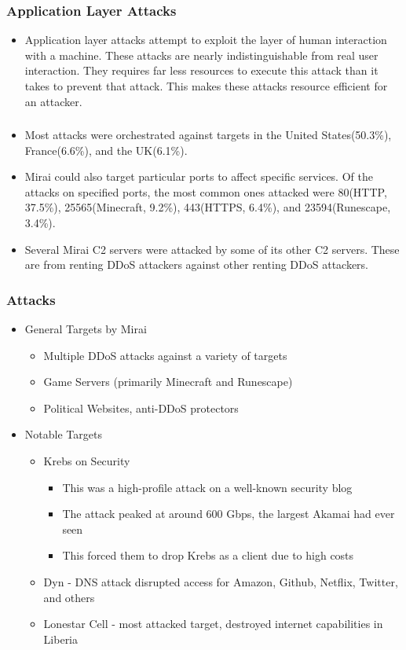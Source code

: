 \documentclass{beamer}
\begin{document}
\begin{frame}
    \frametitle{Application Layer Attacks}
        \begin{itemize}
            \item Application layer attacks attempt to exploit the layer of human interaction with a machine. These attacks are nearly indistinguishable from real user interaction. They requires far less resources to execute this attack than it takes to prevent that attack. This makes these attacks resource efficient for an attacker.
    \end{itemize}
\end{frame}
\begin{frame}
    \frametitle{}
    \begin{itemize}
        \item Most attacks were orchestrated against targets in the United States(50.3\%), France(6.6\%), and the UK(6.1\%).
        \item Mirai could also target particular ports to affect specific services. Of the attacks on specified ports, the most common ones attacked were 80(HTTP, 37.5\%), 25565(Minecraft, 9.2\%), 443(HTTPS, 6.4\%), and 23594(Runescape, 3.4\%).
        \item Several Mirai C2 servers were attacked by some of its other C2 servers. These are from renting DDoS attackers against other renting DDoS attackers.
    \end{itemize}
\end{frame}

\begin{frame}
    \frametitle{Attacks}
	\begin{itemize}
		\item General Targets by Mirai
			\begin{itemize}
				\item Multiple DDoS attacks against a variety of targets
				\item Game Servers (primarily Minecraft and Runescape)
				\item Political Websites, anti-DDoS protectors
			\end{itemize}
		\item Notable Targets
			\begin{itemize}
				\item Krebs on Security
				\begin{itemize}
					\item This was a high-profile attack on a well-known security blog
					\item The attack peaked at around 600 Gbps, the largest Akamai had ever seen 						\item This forced them to drop Krebs as a client due to high costs
				\end{itemize}
				\item Dyn - DNS attack disrupted access for Amazon, Github, Netflix, Twitter, and others
				\item Lonestar Cell - most attacked target, destroyed internet capabilities in Liberia
			\end{itemize}
	\end{itemize}
\end{frame}
\end{document}

